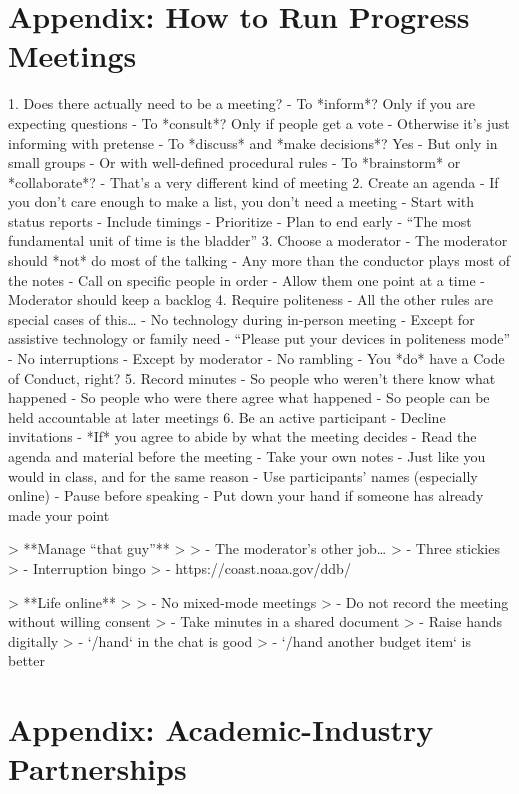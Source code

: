 \documentclass[10pt,letterpaper]{article}
\begin{document}
\section*{Appendix: How to Run Progress Meetings}

1. Does there actually need to be a meeting?
   - To *inform*? Only if you are expecting questions
   - To *consult*? Only if people get a vote
     - Otherwise it's just informing with pretense
   - To *discuss* and *make decisions*? Yes
     - But only in small groups
     - Or with well-defined procedural rules
   - To *brainstorm* or *collaborate*?
     - That's a very different kind of meeting
2. Create an agenda
   - If you don't care enough to make a list, you don't need a meeting
   - Start with status reports
   - Include timings
   - Prioritize
   - Plan to end early
     - ``The most fundamental unit of time is the bladder''
3. Choose a moderator
   - The moderator should *not* do most of the talking
     - Any more than the conductor plays most of the notes
   - Call on specific people in order
   - Allow them one point at a time
   - Moderator should keep a backlog
4. Require politeness
   - All the other rules are special cases of this{\ldots}
   - No technology during in-person meeting
     - Except for assistive technology or family need
     - ``Please put your devices in politeness mode''
   - No interruptions
     - Except by moderator
   - No rambling
   - You *do* have a Code of Conduct, right?
5. Record minutes
   - So people who weren't there know what happened
   - So people who were there agree what happened
   - So people can be held accountable at later meetings
6. Be an active participant
   - Decline invitations
     - *If* you agree to abide by what the meeting decides
   - Read the agenda and material before the meeting
   - Take your own notes
     - Just like you would in class, and for the same reason \cite{Aiken1975,Bohay2011}
   - Use participants' names (especially online)
   - Pause before speaking
   - Put down your hand if someone has already made your point

> **Manage ``that guy''**
>
> - The moderator's other job{\ldots}
> - Three stickies
> - Interruption bingo
> - https://coast.noaa.gov/ddb/

> **Life online**
>
> - No mixed-mode meetings
> - Do not record the meeting without willing consent
> - Take minutes in a shared document
> - Raise hands digitally
>   - `/hand` in the chat is good
>   - `/hand another budget item` is better

\section*{Appendix: Academic-Industry Partnerships}
\end{document}
